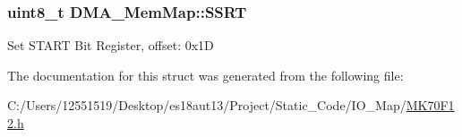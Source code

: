 \subsubsection[{S\+S\+R\+T}]{\setlength{\rightskip}{0pt plus 5cm}uint8\+\_\+t D\+M\+A\+\_\+\+Mem\+Map\+::\+S\+S\+R\+T}\label{struct_d_m_a___mem_map_a39ea12b8e20431f54f8c6ba9f08bfc1b}
Set S\+T\+A\+R\+T Bit Register, offset\+: 0x1\+D 

The documentation for this struct was generated from the following file\+:\begin{DoxyCompactItemize}
\item 
C\+:/\+Users/12551519/\+Desktop/es18aut13/\+Project/\+Static\+\_\+\+Code/\+I\+O\+\_\+\+Map/\hyperlink{_m_k70_f12_8h}{M\+K70\+F12.\+h}\end{DoxyCompactItemize}
